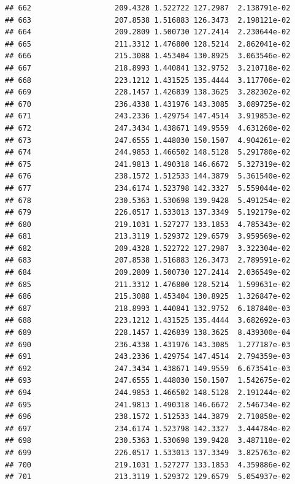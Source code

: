 \documentclass[
]{article}
\begin{document}
\begin{verbatim}
## 662                   209.4328 1.522722 127.2987  2.138791e-02
## 663                   207.8538 1.516883 126.3473  2.198121e-02
## 664                   209.2809 1.500730 127.2414  2.230644e-02
## 665                   211.3312 1.476800 128.5214  2.862041e-02
## 666                   215.3088 1.453404 130.8925  3.063546e-02
## 667                   218.8993 1.440841 132.9752  3.210718e-02
## 668                   223.1212 1.431525 135.4444  3.117706e-02
## 669                   228.1457 1.426839 138.3625  3.282302e-02
## 670                   236.4338 1.431976 143.3085  3.089725e-02
## 671                   243.2336 1.429754 147.4514  3.919853e-02
## 672                   247.3434 1.438671 149.9559  4.631260e-02
## 673                   247.6555 1.448030 150.1507  4.904261e-02
## 674                   244.9853 1.466502 148.5128  5.291780e-02
## 675                   241.9813 1.490318 146.6672  5.327319e-02
## 676                   238.1572 1.512533 144.3879  5.361540e-02
## 677                   234.6174 1.523798 142.3327  5.559044e-02
## 678                   230.5363 1.530698 139.9428  5.491254e-02
## 679                   226.0517 1.533013 137.3349  5.192179e-02
## 680                   219.1031 1.527277 133.1853  4.785343e-02
## 681                   213.3119 1.529372 129.6579  3.959569e-02
## 682                   209.4328 1.522722 127.2987  3.322304e-02
## 683                   207.8538 1.516883 126.3473  2.789591e-02
## 684                   209.2809 1.500730 127.2414  2.036549e-02
## 685                   211.3312 1.476800 128.5214  1.599631e-02
## 686                   215.3088 1.453404 130.8925  1.326847e-02
## 687                   218.8993 1.440841 132.9752  6.187840e-03
## 688                   223.1212 1.431525 135.4444  3.682692e-03
## 689                   228.1457 1.426839 138.3625  8.439300e-04
## 690                   236.4338 1.431976 143.3085  1.277187e-03
## 691                   243.2336 1.429754 147.4514  2.794359e-03
## 692                   247.3434 1.438671 149.9559  6.673541e-03
## 693                   247.6555 1.448030 150.1507  1.542675e-02
## 694                   244.9853 1.466502 148.5128  2.191244e-02
## 695                   241.9813 1.490318 146.6672  2.546734e-02
## 696                   238.1572 1.512533 144.3879  2.710858e-02
## 697                   234.6174 1.523798 142.3327  3.444784e-02
## 698                   230.5363 1.530698 139.9428  3.487118e-02
## 699                   226.0517 1.533013 137.3349  3.825763e-02
## 700                   219.1031 1.527277 133.1853  4.359886e-02
## 701                   213.3119 1.529372 129.6579  5.054937e-02

\end{verbatim}
\end{document}
